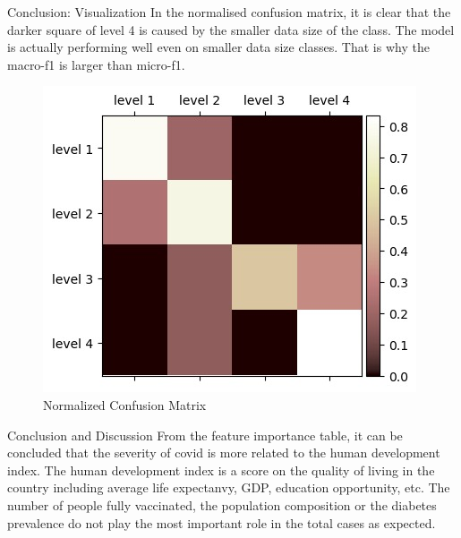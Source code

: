 \begin{frame}{Conclusion: Visualization}
In the normalised confusion matrix, it is clear that the darker square of level 4 is caused by the smaller data size of the class. The model is actually performing well even on smaller data size classes. That is why the macro-f1 is larger than micro-f1.

\begin{figure}[H]
    \centering
    \includegraphics[width=0.5\linewidth]{presentation/images/illustrate/normconfma.jpeg}
    \caption{Normalized Confusion Matrix}
    \end{figure}
\end{frame}

\begin{frame} {Conclusion and Discussion}
From the feature importance table, it can be concluded that the severity of covid is more related 
to the human development index. The human development index is a score on the quality of living in the 
country including average life expectanvy, GDP, education opportunity, etc. The number of people fully 
vaccinated, the population composition or the diabetes prevalence do not play the most important role 
in the total cases as expected.   
\end{frame}